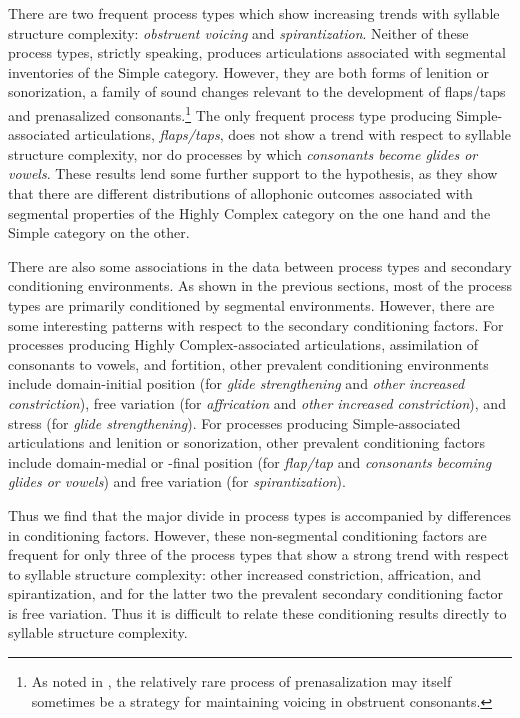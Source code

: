   There are two frequent process types which show increasing trends with syllable structure complexity: \textit{obstruent voicing} and \textit{spirantization}. Neither of these process types, strictly speaking, produces articulations associated with segmental inventories of the Simple category. However, they are both forms of lenition or sonorization, a family of sound changes relevant to the development of flaps/taps and prenasalized consonants.\footnote{{As noted in , the relatively rare process of prenasalization may itself sometimes be a strategy for maintaining voicing in obstruent consonants.}} The only frequent process type producing Simple-associated articulations, \textit{flaps/taps}, does not show a trend with respect to syllable structure complexity, nor do processes by which \textit{consonants become glides or vowels}. These results lend some further support to the hypothesis, as they show that there are different distributions of allophonic outcomes associated with segmental properties of the Highly Complex category on the one hand and the Simple category on the other.

  There are also some associations in the data between process types and secondary conditioning environments. As shown in the previous sections, most of the process types are primarily conditioned by segmental environments. However, there are some interesting patterns with respect to the secondary conditioning factors. For processes producing Highly Complex-associated articulations, assimilation of consonants to vowels, and fortition, other prevalent conditioning environments include domain-initial position (for \textit{glide strengthening} and \textit{other increased constriction}), free variation (for \textit{affrication} and \textit{other increased constriction}), and stress (for \textit{glide strengthening}). For processes producing Simple-associated articulations and lenition or sonorization, other prevalent conditioning factors include domain-medial or -final position (for \textit{flap/tap} and \textit{consonants becoming glides or vowels}) and free variation (for \textit{spirantization}). 

  Thus we find that the major divide in process types is accompanied by differences in conditioning factors. However, these non-segmental conditioning factors are frequent for only three of the process types that show a strong trend with respect to syllable structure complexity: other increased constriction, affrication, and spirantization, and for the latter two the prevalent secondary conditioning factor is free variation. Thus it is difficult to relate these conditioning results directly to syllable structure complexity.

